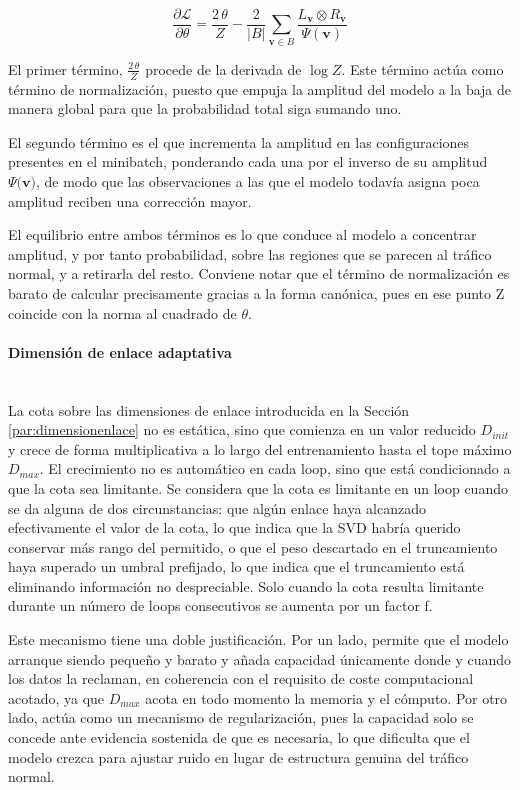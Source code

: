 \documentclass[12pt]{extarticle}
\numberwithin{equation}{section}
\begin{document}
\begin{refsection}
\begin{equation}
\frac{\partial \mathcal{L}}{\partial \theta}
= \frac{2\,\theta}{Z}
- \frac{2}{|B|}\sum_{\mathbf{v}\in B}\frac{L_{\mathbf{v}}\otimes R_{\mathbf{v}}}{\Psi(\mathbf{v})}
\label{eq:gradientenll}
\end{equation}

El primer término, $\frac{2\,\theta}{Z}$ procede de la derivada de $\log{Z}$. Este término actúa como término de normalización, puesto que empuja la amplitud del modelo a la baja de manera global para que la probabilidad total siga sumando uno.

El segundo término es el que incrementa la amplitud en las configuraciones presentes en el minibatch, ponderando cada una por el inverso de su amplitud $\Psi(\mathbf{v)}$, de modo que las observaciones a las que el modelo todavía asigna poca amplitud reciben una corrección mayor.

El equilibrio entre ambos términos es lo que conduce al modelo a concentrar amplitud, y por tanto probabilidad, sobre las regiones que se parecen al tráfico normal, y a retirarla del resto. Conviene notar que el término de normalización es barato de calcular precisamente gracias a la forma canónica, pues en ese punto Z coincide con la norma al cuadrado de $\theta$.

\paragraph{Dimensión de enlace adaptativa}
\mbox{}\\

La cota sobre las dimensiones de enlace introducida en la Sección \ref{par:dimensionenlace} no es estática, sino que comienza en un valor reducido $D_{init}$ y crece de forma multiplicativa a lo largo del entrenamiento hasta el tope máximo $D_{max}$. El crecimiento no es automático en cada loop, sino que está condicionado a que la cota sea limitante. Se considera que la cota es limitante en un loop cuando se da alguna de dos circunstancias: que algún enlace haya alcanzado efectivamente el valor de la cota, lo que indica que la SVD habría querido conservar más rango del permitido, o que el peso descartado en el truncamiento haya superado un umbral prefijado, lo que indica que el truncamiento está eliminando información no despreciable. Solo cuando la cota resulta limitante durante un número de loops consecutivos se aumenta por un factor f.

Este mecanismo tiene una doble justificación. Por un lado, permite que el modelo arranque siendo pequeño y barato y añada capacidad únicamente donde y cuando los datos la reclaman, en coherencia con el requisito de coste computacional acotado, ya que $D_{max}$ acota en todo momento la memoria y el cómputo. Por otro lado, actúa como un mecanismo de regularización, pues la capacidad solo se concede ante evidencia sostenida de que es necesaria, lo que dificulta que el modelo crezca para ajustar ruido en lugar de estructura genuina del tráfico normal.


\end{refsection}
\end{document}
